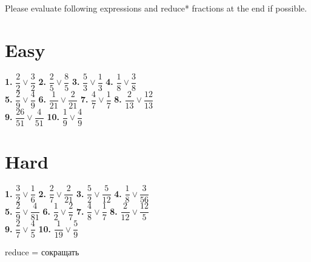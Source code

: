 \documentclass[a4paper, 12pt]{article}
\begin{document}
	{\large Please evaluate following expressions and reduce* fractions at the end if possible.}	
	
	\section* {{\Large Easy}}
	
	{\Large \textbf{1.} $\dfrac{2}{2}\vee\dfrac{3}{2}$ \hspace{0.6cm}
		   \textbf{2.} $\dfrac{2}{5}\vee\dfrac{8}{5}$ \hspace{0.6cm}
		   \textbf{3.} $\dfrac{5}{3}\vee\dfrac{1}{3}$ \hspace{0.6cm}
		   \textbf{4.} $\dfrac{1}{8}\vee\dfrac{3}{8}$ \\ [0.6cm]
		   \textbf{5.} $\dfrac{2}{9}\vee\dfrac{4}{9}$ \hspace{0.6cm}
		   \textbf{6.} $\dfrac{1}{21}\vee\dfrac{2}{21}$ \hspace{0.6cm}
		   \textbf{7.} $\dfrac{4}{7}\vee\dfrac{1}{7}$ \hspace{0.6cm}
		   \textbf{8.} $\dfrac{2}{13}\vee\dfrac{12}{13}$ \\ [0.6cm]
		   \textbf{9.} $\dfrac{26}{51}\vee\dfrac{4}{51}$ \hspace{0.6cm}
		   \textbf{10.} $\dfrac{1}{9}\vee\dfrac{4}{9}$}
	
	\section* {{\Large Hard}}
	
	{\Large \textbf{1.} $\dfrac{3}{2}\vee\dfrac{1}{6}$ \hspace{0.6cm}
		   \textbf{2.} $\dfrac{2}{7}\vee\dfrac{2}{21}$ \hspace{0.6cm}
		   \textbf{3.} $\dfrac{5}{2}\vee\dfrac{5}{12}$ \hspace{0.6cm}
		   \textbf{4.} $\dfrac{1}{8}\vee\dfrac{3}{56}$ \\ [0.6cm]
		   \textbf{5.} $\dfrac{2}{9}\vee\dfrac{4}{81}$ \hspace{0.6cm}
		   \textbf{6.} $\dfrac{1}{2}\vee\dfrac{2}{7}$ \hspace{0.6cm}
		   \textbf{7.} $\dfrac{4}{8}\vee\dfrac{1}{7}$ \hspace{0.6cm}
		   \textbf{8.} $\dfrac{2}{12}\vee\dfrac{12}{5}$ \\ [0.6cm]
		   \textbf{9.} $\dfrac{2}{7}\vee\dfrac{4}{5}$  \hspace{0.6cm}
		   \textbf{10.} $\dfrac{1}{19}\vee\dfrac{5}{9}$ \\ [0.6cm]}
	   
	 {\large *reduce = сокращать}
		
\end{document}
